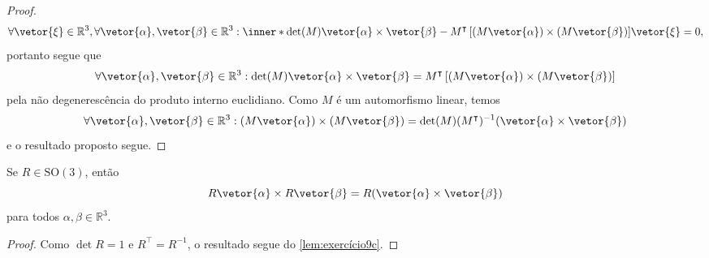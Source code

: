 \begin{proof}
    \begin{equation*}
        \forall \vetor{\xi} \in \mathbb{R}^3, \forall \vetor{\alpha}, \vetor{\beta}\in \mathbb{R}^3 : \inner*{\det(M) \vetor{\alpha}\times \vetor{\beta} - M^\intercal\left[(M\vetor{\alpha})\times (M\vetor{\beta})\right]}{\vetor{\xi}} = 0,
    \end{equation*}
    portanto segue que
    \begin{equation*}
        \forall \vetor{\alpha}, \vetor{\beta}\in \mathbb{R}^3 : \det(M) \vetor{\alpha}\times\vetor{\beta} = M^\intercal \left[(M\vetor{\alpha})\times (M\vetor{\beta})\right]
    \end{equation*}
    pela não degenerescência do produto interno euclidiano. Como \(M\) é um automorfismo linear, temos
    \begin{equation*}
        \forall \vetor{\alpha}, \vetor{\beta}\in \mathbb{R}^3 : (M\vetor{\alpha})\times (M\vetor{\beta}) = \det(M) (M^\intercal)^{-1}(\vetor{\alpha}\times \vetor{\beta})
    \end{equation*}
    e o resultado proposto segue.
\end{proof}
\begin{corollary}
    Se \(R \in \mathrm{SO}(3)\), então
    \begin{equation*}
        R\vetor{\alpha}\times R\vetor{\beta} = R(\vetor{\alpha}\times \vetor{\beta})
    \end{equation*}
    para todos \(\alpha, \beta \in \mathbb{R}^3\).
\end{corollary}
\begin{proof}
    Como \(\det R = 1\) e \(R^\intercal = R^{-1}\), o resultado segue do \cref{lem:exercício9c}.
\end{proof}

